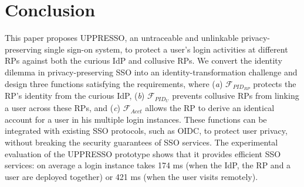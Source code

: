 \section{Conclusion}
\label{sec:conclusion}
This paper proposes UPPRESSO, an untraceable and unlinkable privacy-preserving single sign-on system,
 to protect a user's login activities at different RPs against both the curious IdP and collusive RPs.
We convert the identity dilemma in privacy-preserving SSO into an identity-transformation challenge
 and design three functions satisfying the requirements,
 where (\emph{a}) $\mathcal{F}_{PID_{RP}}$ protects the RP's identity from the curious IdP,
(\emph{b})  $\mathcal{F}_{PID_{U}}$ prevents collusive RPs from linking a user across these RPs,
 and (\emph{c}) $\mathcal{F}_{Acct}$ allows the RP to derive an identical account for a user in his multiple login instances.
These functions can be integrated with existing SSO protocols,
    such as OIDC,
    to protect user privacy,
    without breaking the security guarantees of SSO services.
The experimental evaluation of the UPPRESSO prototype shows
 that it provides efficient SSO services:
  on average a login instance takes 174 ms (when the IdP, the RP and a user are deployed together) or 421 ms (when the user visits remotely).



\newpage